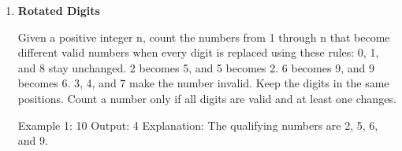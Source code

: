 \begin{enumerate}
\begin{console}
Example 2: ["dog", "racecar", "car"]
Output:    ""
\end{console}\newpage


\item \textbf{Rotated Digits}

Given a positive integer n, count the numbers from 1 through n that become different valid numbers when every digit is replaced using these rules:
0, 1, and 8 stay unchanged.
2 becomes 5, and 5 becomes 2.
6 becomes 9, and 9 becomes 6.
3, 4, and 7 make the number invalid.
Keep the digits in the same positions. Count a number only if all digits are valid and at least one changes.

\begin{console}
Example 1: 10
Output:    4
Explanation: The qualifying numbers are 2, 5, 6, and 9.
\end{console}\newpage
\end{enumerate}
